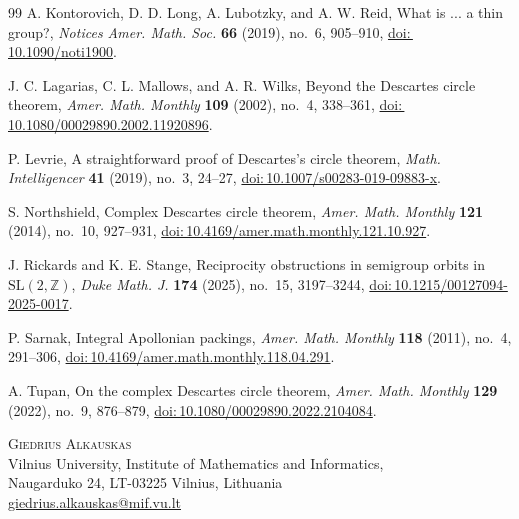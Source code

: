 \documentclass[12pt]{article}
\theoremstyle{definition}
\theoremstyle{remark}
\providecommand{\doi}[1]{\href{https://doi.org/#1}{doi:\,#1}}
\begin{document}
{\begin{thebibliography}{99}
		A. Kontorovich, D. D. Long, A. Lubotzky, and A. W. Reid,
		What is ... a thin group?,
		\emph{Notices Amer. Math. Soc.} \textbf{66} (2019), no.~6, 905--910,
		\doi{10.1090/noti1900}.
		
		J. C. Lagarias, C. L. Mallows, and A. R. Wilks,
		Beyond the Descartes circle theorem,
		\emph{Amer. Math. Monthly} \textbf{109} (2002), no.~4, 338--361,
		\doi{10.1080/00029890.2002.11920896}.
		
		P. Levrie,
		A straightforward proof of Descartes's circle theorem,
		\emph{Math. Intelligencer} \textbf{41} (2019), no.~3, 24--27,
		\doi{10.1007/s00283-019-09883-x}.
		
		S. Northshield,
		Complex Descartes circle theorem,
		\emph{Amer. Math. Monthly} \textbf{121} (2014), no.~10, 927--931,
		\doi{10.4169/amer.math.monthly.121.10.927}.
		
		J. Rickards and K. E. Stange,
		Reciprocity obstructions in semigroup orbits in
		$\mathrm{SL}(2,\mathbb Z)$,
		\emph{Duke Math. J.} \textbf{174} (2025), no.~15, 3197--3244,
		\doi{10.1215/00127094-2025-0017}.
		
		P. Sarnak,
		Integral Apollonian packings,
		\emph{Amer. Math. Monthly} \textbf{118} (2011), no.~4, 291--306,
		\doi{10.4169/amer.math.monthly.118.04.291}.
		
		A. Tupan,
		On the complex Descartes circle theorem,
		\emph{Amer. Math. Monthly} \textbf{129} (2022), no.~9, 876--879,
		\doi{10.1080/00029890.2022.2104084}.
		
	\end{thebibliography}
}

\noindent\small
\textsc{Giedrius Alkauskas}\\
Vilnius University, Institute of Mathematics and Informatics,\\
Naugarduko 24, LT-03225 Vilnius, Lithuania\\
\href{mailto:giedrius.alkauskas@mif.vu.lt}{giedrius.alkauskas@mif.vu.lt}
\end{document}
